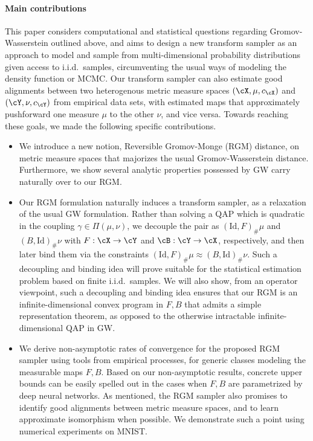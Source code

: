 \documentclass[11pt]{article}
\begin{document}
\paragraph{Main contributions}
This paper considers computational and statistical questions regarding Gromov-Wasserstein outlined above, and aims to design a new transform sampler as an approach to model and sample from multi-dimensional probability distributions given access to i.i.d.\ samples, circumventing the usual ways of modeling the density function or MCMC. Our transform sampler can also estimate good alignments between two heterogenous metric measure spaces $(\cX, \mu, c_{\cX})$ and $(\cY, \nu, c_{\cY})$ from empirical data sets, with estimated maps that approximately pushforward one measure $\mu$ to the other $\nu$, and vice versa. Towards reaching these goals, we made the following specific contributions.
\begin{itemize}
	\item We introduce a new notion, Reversible Gromov-Monge (RGM) distance, on metric measure spaces that majorizes the usual Gromov-Wasserstein distance. Furthermore, we show several analytic properties possessed by GW carry naturally over to our RGM.
	
	\item Our RGM formulation naturally induces a transform sampler, as a relaxation of the usual GW formulation. Rather than solving a QAP which is quadratic in the coupling $\gamma \in \Pi(\mu, \nu)$, we decouple the pair as $(\mathrm{Id}, F)_{\#} \mu$ and $(B, \mathrm{Id})_{\#} \nu$ with $F:\cX \rightarrow \cY$ and $\cB:\cY \rightarrow \cX$, respectively, and then later bind them via the constraints $(\mathrm{Id}, F)_{\#} \mu \approx (B, \mathrm{Id})_{\#} \nu$. Such a decoupling and binding idea will prove suitable for the statistical estimation problem based on finite i.i.d.\ samples. We will also show, from an operator viewpoint, such a decoupling and binding idea ensures that our RGM is an infinite-dimensional convex program in $F, B$ that admits a simple representation theorem, as opposed to the otherwise intractable infinite-dimensional QAP in GW.
	
	\item We derive non-asymptotic rates of convergence for the proposed RGM sampler using tools from empirical processes, for generic classes modeling the measurable maps $F, B$. Based on our non-asymptotic results, concrete upper bounds can be easily spelled out in the cases when $F, B$ are parametrized by deep neural networks. As mentioned, the RGM sampler also promises to identify good alignments between metric measure spaces, and to learn approximate isomorphism when possible. We demonstrate such a point using numerical experiments on MNIST.
	
\end{itemize}
\end{document}
